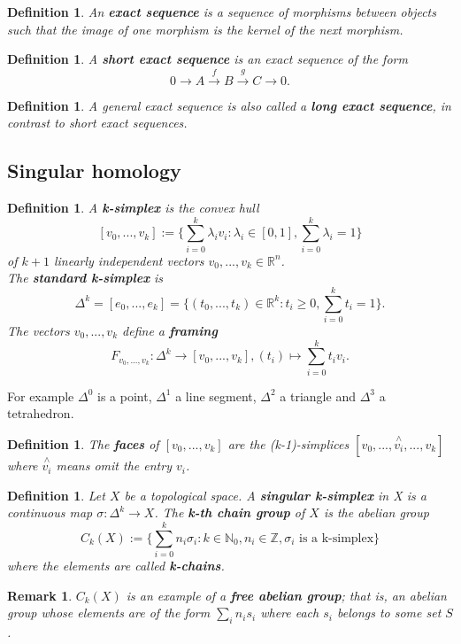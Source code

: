 \documentclass{article}
\newtheorem{definition}[theorem]{Definition}
\newtheorem{remark}[theorem]{Remark}
\begin{document}
\begin{definition}
An \textbf{exact sequence} is a sequence of morphisms between objects such that the image of one morphism is the kernel of the next morphism.
\end{definition}

\begin{definition}
A \textbf{short exact sequence} is an exact sequence of the form\[0\longrightarrow A\overset{f}{\longrightarrow}B\overset{g}{\longrightarrow}C\longrightarrow0.\]
\end{definition}
\begin{definition}
A general exact sequence is also called a \textbf{long exact sequence}, in contrast to short exact sequences.
\end{definition}

\subsection{Singular homology}
\begin{definition}
A \textbf{k-simplex} is the convex hull\[[v_0,...,v_k]:=\{\sum_{i=0}^k\lambda_iv_i:\lambda_i\in [0,1],\sum_{i=0}^k\lambda_i=1\}\]
of $k+1$ linearly independent vectors $v_0,...,v_k\in\mathbb{R}^n$.\\
The \textbf{standard k-simplex} is\[\Delta^k=[e_0,...,e_k]=\{(t_0,...,t_k)\in\mathbb{R}^k:t_i\geq 0, \sum_{i=0}^kt_i=1\}.\]
The vectors $v_0,...,v_k$ define a \textbf{framing} \[F_{v_0,...,v_k}\colon\Delta^k\rightarrow [v_0,...,v_k],(t_i)\mapsto \sum_{i=0}^kt_iv_i.\]
\end{definition}


\noindent For example $\Delta^0$ is a point, $\Delta^1$ a line segment, $\Delta^2$ a triangle and $\Delta^3$ a tetrahedron.

\begin{definition}
The \textbf{faces} of $[v_0,...,v_k]$ are the (k-1)-simplices $[v_0,...,\overset{\wedge}{v_i},...,v_k]$ where $\overset{\wedge}{v_i}$ means omit the entry $v_i$.
\end{definition}

\begin{definition}
Let $X$ be a topological space. A \textbf{singular k-simplex} in X is a continuous map $\sigma\colon\Delta^k\to X$. The \textbf{k-th chain group} of $X$ is the abelian group\[C_k(X):=\{\sum_{i=0}^kn_i\sigma_i:k\in\mathbb{N}_0,n_i\in\mathbb{Z},\sigma_i \text{ is a k-simplex}\}\] where the elements are called \textbf{k-chains}.
\end{definition}
\begin{remark}
$C_k(X)$ is an example of a \textbf{free abelian group}; that is, an abelian group whose elements are of the form $\sum_in_is_i$ where each $s_i$ belongs to some set $S$.
\end{remark}
\end{document}
